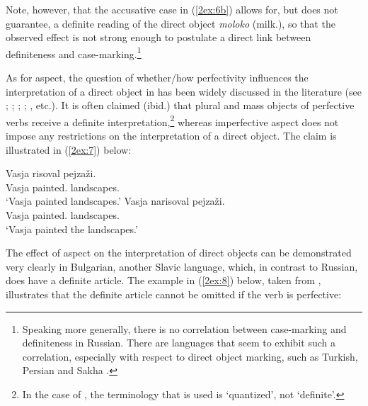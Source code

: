 \documentclass[output=paper]{langsci/langscibook}
\begin{document}
Note, however, that the accusative case in (\ref{2ex:6b}) allows for, but does not guarantee, a definite reading of the direct object {\emph{moloko}} (milk.{}), so that the observed effect is not strong enough to postulate a direct link between definiteness and case-marking.\footnote{{Speaking more generally, there is no correlation between case-marking and definiteness in Russian. There are languages that seem to exhibit such a correlation, especially with respect to direct object marking, such as Turkish, Persian \citep{comrie:81} and Sakha \citep{baker:15}.}}

As for aspect, the question of whether/how perfectivity influences the interpretation of a direct object in  has been widely discussed in the literature (see \citealt{wierzbicka:67}; \citealt{krifka:92}; \citealt{schoorlemmer:95}; \citealt{verkuyl:98}; \citealt{filip:99}, etc.). It is often claimed (ibid.) that plural and mass objects of perfective verbs receive a definite interpretation,\footnote{In the case of \cite{verkuyl:98}, the terminology that is used is `quantized', not `definite'.} whereas imperfective aspect does not impose any restrictions on the interpretation of a direct object. The claim is illustrated in (\ref{2ex:7}) below:

\begin{exe}
\ex\label{2ex:7}
	\begin{xlista}
	\ex\label{2ex:7a}
	\gll	Vasja 	risoval 			pejza\v{z}i. \\
		Vasja 	painted.{} 	landscapes.{} \\
	\glt	`Vasja painted landscapes.'
	\ex\label{2ex:7b}
	\gll	Vasja 	narisoval 			pejza\v{z}i. \\
		Vasja 	painted.{} 	landscapes.{} \\
	\glt	`Vasja painted the landscapes.'
	\end{xlista}
\end{exe}

The effect of aspect on the interpretation of direct objects can be demonstrated very clearly in Bulgarian, another Slavic language, which, in contrast to Russian, does have a definite article. The example in (\ref{2ex:8}) below, taken from \cite[][944]{dimitrova:vulchanova:12}, illustrates that the definite article cannot be omitted if the verb is perfective: 
\end{document}
